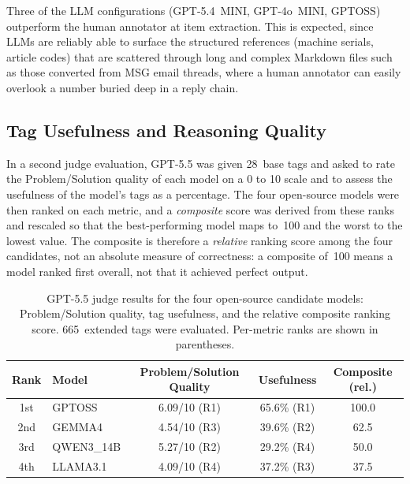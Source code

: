Three of the LLM configurations (GPT-5.4~MINI, GPT-4o~MINI, GPTOSS) outperform
the human annotator at item extraction.  This is expected, since LLMs are
reliably able to surface the structured references (machine serials, article
codes) that are scattered through long and complex Markdown files such as those
converted from MSG email threads, where a human annotator can easily overlook a
number buried deep in a reply chain.

\subsection{Tag Usefulness and Reasoning Quality}
\label{subsec:judge-composite}
%
In a second judge evaluation, GPT-5.5 was given 28~base tags and asked to
rate the Problem/Solution quality of each model on a 0 to 10 scale and to assess
the usefulness of the model's tags as a percentage.  The four open-source
models were then ranked on each metric, and a \emph{composite} score was
derived from these ranks and rescaled so that the best-performing model
maps to~100 and the worst to the lowest value.  The composite is therefore a
\emph{relative} ranking score among the four candidates, not an absolute
measure of correctness: a composite of~100 means a model ranked first overall,
not that it achieved perfect output.

\begin{table}[H]
    \centering
    \caption[GPT-5.5 judge results for the four open-source candidate models]{GPT-5.5 judge results for the four open-source candidate models:
             Problem/Solution quality, tag usefulness, and the relative composite ranking
             score. 665~extended tags were evaluated. Per-metric ranks are
             shown in parentheses.}
    \label{tab:judge-results}
    \begin{tabular}{clccc}
        \hline
        \textbf{Rank} & \textbf{Model} & \textbf{Problem/Solution Quality} & \textbf{Usefulness} & \textbf{Composite (rel.)} \\
        \hline
        1st & GPTOSS      & 6.09/10 (R1) & 65.6\% (R1) & 100.0 \\
        2nd & GEMMA4       & 4.54/10 (R3) & 39.6\% (R2) &  62.5 \\
        3rd & QWEN3\_14B   & 5.27/10 (R2) & 29.2\% (R4) &  50.0 \\
        4th & LLAMA3.1     & 4.09/10 (R4) & 37.2\% (R3) &  37.5 \\
        \hline
    \end{tabular}
\end{table}

